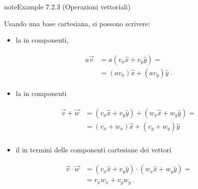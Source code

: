 \documentclass[letterpaper,10pt,italian]{jupyterBook}
\begin{document}
\begin{sphinxadmonition}{note}{Example 7.2.3 (Operazioni vettoriali)}



\sphinxAtStartPar
Usando una base cartesiana, si possono scrivere:
\begin{itemize}
\item {} 
\sphinxAtStartPar
la  in componenti,

\end{itemize}
\begin{equation*}
\begin{split}\begin{aligned}
   a \vec{v}           & = a (v_x \hat{x} + v_y \hat{y} ) = \\
                       & =   ( a v_x ) \hat{x} + ( a v_y ) \hat{y} \ .
  \end{aligned}\end{split}
\end{equation*}\begin{itemize}
\item {} 
\sphinxAtStartPar
la  in componenti

\end{itemize}
\begin{equation*}
\begin{split}\begin{aligned}
     \vec{v} + \vec{w} & =   (v_x \hat{x} + v_y \hat{y} ) + (w_x \hat{x} + w_y \hat{y} ) = \\
                       & =   (v_x + w_x) \hat{x} + (v_y + w_y) \hat{y} \\
  \end{aligned}\end{split}
\end{equation*}\begin{itemize}
\item {} 
\sphinxAtStartPar
il  in termini delle componenti cartesiane dei vettori

\end{itemize}
\begin{equation*}
\begin{split}\begin{aligned}
    \vec{v} \cdot \vec{w}
    & = (v_x \hat{x} + v_y \hat{y} ) \cdot (w_x \hat{x} + w_y \hat{y}) = \\
    & = v_x w_x + v_y w_y \ .
  \end{aligned}\end{split}
\end{equation*}\end{sphinxadmonition}
\end{document}
